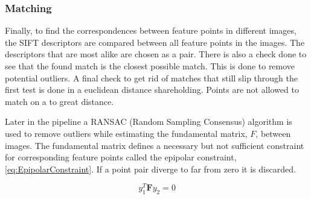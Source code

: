 \subsubsection{Matching}
Finally, to find the correspondences between feature points in different images, the SIFT descriptors are compared between all feature points in the images. The descriptors that are most alike are chosen as a pair. There is also a check done to see that the found match is the closest possible match. This is done to remove potential outliers. A final check to get rid of matches that still slip through the first test is done in a euclidean distance shareholding. Points are not allowed to match on a to great distance.

Later in the pipeline a RANSAC (Random Sampling Consensus) algorithm is used to remove outliers while estimating the fundamental matrix, $F$, between images. The fundamental matrix defines a necessary but not sufficient constraint for corresponding feature points called the epipolar constraint, \ref{eq:EpipolarConstraint}. If a point pair diverge to far from zero it is discarded.

\begin{equation}
\label{eq:EpipolarConstraint}
y_1^T \boldsymbol{F} y_2 = 0
\end{equation} 